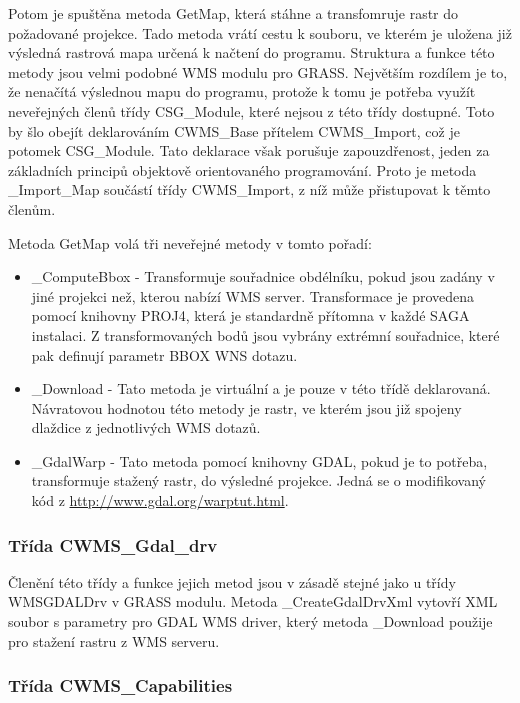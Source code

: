 \documentclass[a4paper,12pt]{article}
\begin{document}
Potom je spuštěna metoda GetMap, která stáhne a transfomruje rastr do požadované projekce. Tado metoda vrátí cestu k souboru, ve kterém je uložena již výsledná rastrová mapa určená k načtení do programu.
Struktura a funkce této metody jsou velmi podobné WMS modulu pro GRASS. Největším rozdílem je to, že nenačítá výslednou mapu do programu, protože k tomu je potřeba využít neveřejných členů třídy CSG\_Module, 
které nejsou z této třídy dostupné. Toto by šlo obejít deklarováním CWMS\_Base přítelem CWMS\_Import, což je potomek CSG\_Module. Tato deklarace však porušuje zapouzdřenost, jeden za základních principů objektově orientovaného
programování. Proto je metoda \_Import\_Map součástí třídy CWMS\_Import, z níž může přistupovat k těmto členům.

Metoda GetMap volá tři neveřejné metody v tomto pořadí:
\begin{itemize}
 \item \_ComputeBbox - Transformuje souřadnice obdélníku, pokud jsou zadány v jiné projekci než, kterou nabízí WMS server. Transformace je provedena pomocí knihovny PROJ4, která je standardně přítomna v každé SAGA instalaci. Z transformovaných bodů jsou vybrány extrémní souřadnice, které pak definují parametr BBOX WNS dotazu. 
 \item \_Download - Tato metoda je virtuální a je pouze v této třídě deklarovaná. 
 Návratovou hodnotou této metody je rastr, ve kterém jsou již spojeny dlaždice
 z jednotlivých WMS dotazů.
 \item \_GdalWarp - Tato metoda pomocí knihovny GDAL, pokud je to potřeba, transformuje stažený rastr, do výsledné projekce. Jedná se o modifikovaný kód z \url{http://www.gdal.org/warptut.html}.
\end{itemize}

\subsubsection{Třída CWMS\_Gdal\_drv}

Členění této třídy a funkce jejich metod jsou v zásadě stejné jako u třídy WMSGDALDrv v GRASS modulu. Metoda \_CreateGdalDrvXml vytovří XML soubor s parametry pro GDAL WMS driver, 
který metoda  \_Download použije pro stažení rastru z WMS serveru. 


\subsubsection{Třída CWMS\_Capabilities}
\end{document}
